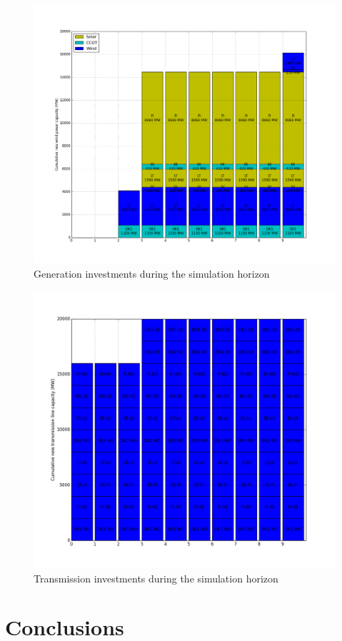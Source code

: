 \documentclass[final]{IEEEtran}
\begin{document}
\begin{figure}[htpb]
	\centering
	\includegraphics[width=\linewidth]{generation_investment_milp_dc_miqp_dc.png}
	\caption{Generation investments during the simulation horizon}
	\label{fig_generation_investment}
\end{figure}

\begin{figure}[htpb]
	\centering
	\includegraphics[width=\linewidth]{transmission_investment_milp_dc_miqp_dc.png}
	\caption{Transmission investments during the simulation horizon}
	\label{fig_transmission_investment}
\end{figure}

\section{Conclusions}
\label{section_conclusions}




\end{document}
